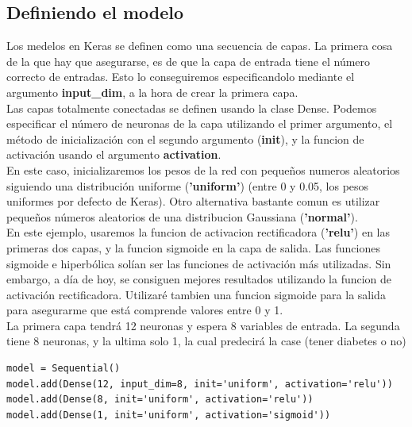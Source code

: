 \subsection{Definiendo el modelo}
Los medelos en Keras se definen como una secuencia de capas. La primera cosa de la que hay que asegurarse, es de que la capa de entrada tiene el número correcto de entradas. Esto lo conseguiremos especificandolo mediante el argumento \textbf{input\_dim}, a la hora de crear la primera capa.\\
Las capas totalmente conectadas se definen usando la clase Dense. Podemos especificar el número de neuronas de la capa utilizando el primer argumento, el método de inicialización con el segundo argumento (\textbf{init}), y la funcion de activación usando el argumento  \textbf{activation}.\\
En este caso, inicializaremos los pesos de la red con pequeños numeros aleatorios siguiendo una distribución uniforme (\textbf{'uniform'}) (entre 0 y 0.05, los pesos uniformes por defecto de Keras). Otro alternativa bastante comun es utilizar pequeños números aleatorios de una distribucion Gaussiana (\textbf{'normal'}).\\
En este ejemplo, usaremos la funcion de activacion rectificadora (\textbf{'relu'}) en las primeras dos capas, y la funcion sigmoide en la capa de salida. Las funciones sigmoide e hiperbólica solían ser las funciones de activación más utilizadas. Sin embargo, a día de hoy, se consiguen mejores resultados utilizando la funcion de activación rectificadora. Utilizaré tambien una funcion sigmoide para la salida para asegurarme que está comprende valores entre 0 y 1.\\
La primera capa tendrá  12 neuronas y espera 8 variables de entrada. La segunda tiene 8 neuronas, y la ultima solo 1, la cual predecirá la case (tener diabetes o no)
\begin{verbatim}
model = Sequential()
model.add(Dense(12, input_dim=8, init='uniform', activation='relu'))
model.add(Dense(8, init='uniform', activation='relu'))
model.add(Dense(1, init='uniform', activation='sigmoid'))
\end{verbatim}

